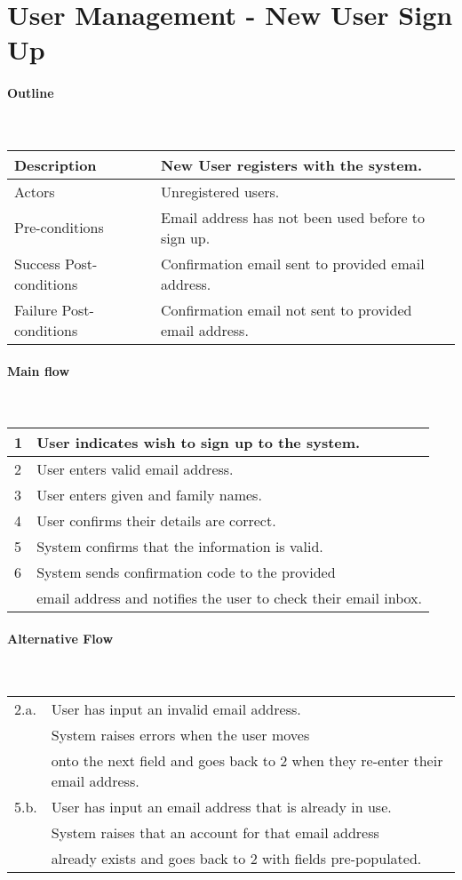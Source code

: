 \section*{User Management - New User Sign Up} %

\paragraph*{Outline} \

\begin{tabular}{ | l | l | }
\hline
Description & New User registers with the system. \\ \hline
Actors & Unregistered users. \\ \hline
Pre-conditions & Email address has not been used before to sign up. \\ \hline
Success Post-conditions & Confirmation email sent to provided email address. \\ \hline
Failure Post-conditions & Confirmation email not sent to provided email address. \\ \hline
\end{tabular}


\paragraph*{Main flow} \

\begin{tabular}{ | l | l | } \hline
1 & User indicates wish to sign up to the system. \\ \hline
2 & User enters valid email address. \\ \hline
3 & User enters given and family names. \\ \hline
4 & User confirms their details are correct. \\ \hline
5 & System confirms that the information is valid. \\ \hline
6 & System sends confirmation code to the provided \\
  & email address and notifies the user to check their email inbox. \\ \hline
\end{tabular}


\paragraph*{Alternative Flow} \

\begin{tabular}{ | l | l | } \hline
2.a. & User has input an invalid email address. \\
     & System raises errors when the user moves  \\
  & onto the next field and goes back to 2 when they re-enter their email address. \\ \hline
5.b. & User has input an email address that is already in use. \\
     & System raises that an account for that email address  \\
  & already exists and goes back to 2 with fields pre-populated. \\ \hline
\end{tabular}